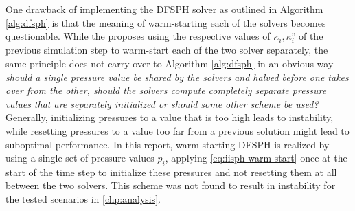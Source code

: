 \documentclass[oneside, a4paper]{book}
\begin{document}
    One drawback of implementing the DFSPH solver as outlined in Algorithm \ref{alg:dfsph} is that the meaning of warm-starting each of the solvers becomes questionable. While the \autocite[original paper]{dfsph} proposes using the respective values of $\kappa_i, \kappa_i^v$ of the previous simulation step to warm-start each of the two solver separately, the same principle does not carry over to Algorithm \ref{alg:dfsph} in an obvious way - \textit{should a single pressure value be shared by the solvers and halved before one takes over from the other, should the solvers compute completely separate pressure values that are separately initialized or should some other scheme be used?} Generally, initializing pressures to a value that is too high leads to instability, while resetting pressures to a value too far from a previous solution might lead to suboptimal performance. In this report, warm-starting DFSPH is realized by using a single set of pressure values $p_i$, applying \autoref{eq:iisph-warm-start} once at the start of the time step to initialize these pressures and not resetting them at all between the two solvers. This scheme was not found to result in instability for the tested scenarios in \autoref{chp:analysis}.
\end{document}
